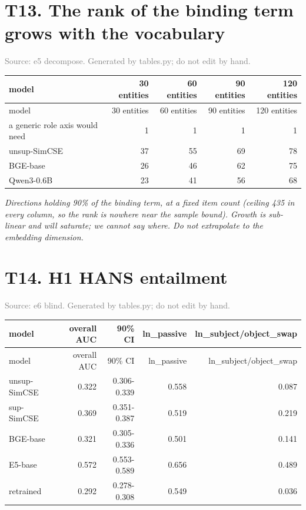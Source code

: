\documentclass[10pt]{article}
\begin{document}
\section*{T13. The rank of the binding term grows with the vocabulary}
\textcolor{gray}{Source: e5 decompose. Generated by tables.py; do not edit by hand.}

\footnotesize
\begin{longtable}{>{\raggedright\arraybackslash}p{4.6cm}rrrr}
\toprule
model & 30 entities & 60 entities & 90 entities & 120 entities \\
\midrule
\endfirsthead
\toprule
model & 30 entities & 60 entities & 90 entities & 120 entities \\
\midrule
\endhead
\bottomrule
\endfoot
a generic role axis would need & 1 & 1 & 1 & 1 \\
unsup-SimCSE & 37 & 55 & 69 & 78 \\
BGE-base & 26 & 46 & 62 & 75 \\
Qwen3-0.6B & 23 & 41 & 56 & 68 \\
\end{longtable}
\normalsize

\textit{Directions holding 90\% of the binding term, at a fixed item count (ceiling 435 in every column, so the rank is nowhere near the sample bound). Growth is sub-linear and will saturate; we cannot say where. Do not extrapolate to the embedding dimension.}
\clearpage

\section*{T14. H1  HANS entailment}
\textcolor{gray}{Source: e6 blind. Generated by tables.py; do not edit by hand.}

\footnotesize
\begin{longtable}{lrrrr}
\toprule
model & overall AUC & 90\% CI & ln\_passive & ln\_subject/object\_swap \\
\midrule
\endfirsthead
\toprule
model & overall AUC & 90\% CI & ln\_passive & ln\_subject/object\_swap \\
\midrule
\endhead
\bottomrule
\endfoot
unsup-SimCSE & 0.322 & 0.306-0.339 & 0.558 & 0.087 \\
sup-SimCSE & 0.369 & 0.351-0.387 & 0.519 & 0.219 \\
BGE-base & 0.321 & 0.305-0.336 & 0.501 & 0.141 \\
E5-base & 0.572 & 0.553-0.589 & 0.656 & 0.489 \\
retrained & 0.292 & 0.278-0.308 & 0.549 & 0.036 \\
\end{longtable}
\normalsize
\end{document}
